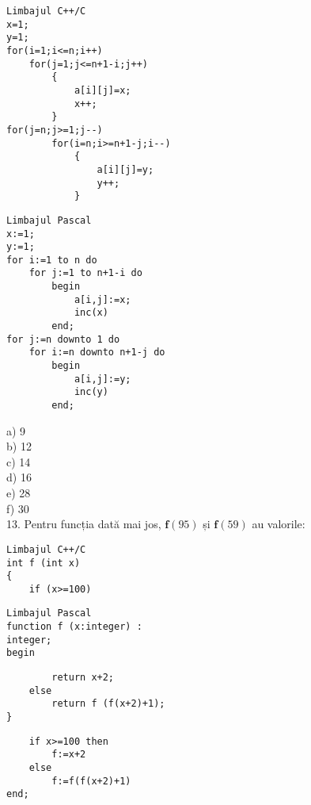\begin{verbatim}
Limbajul C++/C
x=1;
y=1;
for(i=1;i<=n;i++)
    for(j=1;j<=n+1-i;j++)
        {
            a[i][j]=x;
            x++;
        }
for(j=n;j>=1;j--)
        for(i=n;i>=n+1-j;i--)
            {
                a[i][j]=y;
                y++;
            }
\end{verbatim}

\begin{verbatim}
Limbajul Pascal
x:=1;
y:=1;
for i:=1 to n do
    for j:=1 to n+1-i do
        begin
            a[i,j]:=x;
            inc(x)
        end;
for j:=n downto 1 do
    for i:=n downto n+1-j do
        begin
            a[i,j]:=y;
            inc(y)
        end;
\end{verbatim}

a) 9\\
b) 12\\
c) 14\\
d) 16\\
e) 28\\
f) 30\\
13. Pentru funcția dată mai jos, $\mathbf{f}(95)$ și $\mathbf{f}(59)$ au valorile:

\begin{verbatim}
Limbajul C++/C
int f (int x)
{
    if (x>=100)
\end{verbatim}

\begin{verbatim}
Limbajul Pascal
function f (x:integer) :
integer;
begin
\end{verbatim}

\begin{verbatim}
        return x+2;
    else
        return f (f(x+2)+1);
}
\end{verbatim}

\begin{verbatim}
    if x>=100 then
        f:=x+2
    else
        f:=f(f(x+2)+1)
end;
\end{verbatim}

